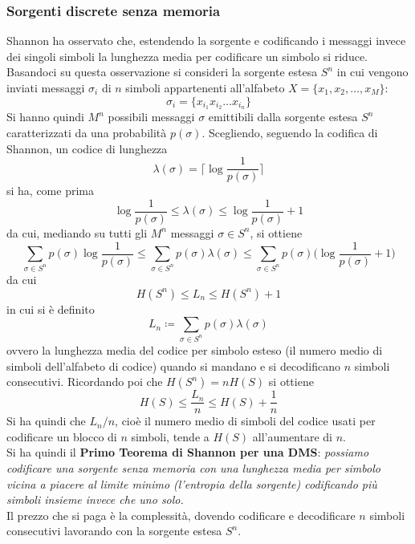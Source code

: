 \subsubsection{Sorgenti discrete senza memoria}
Shannon ha osservato che, estendendo la sorgente e codificando i messaggi invece dei singoli simboli la lunghezza media per codificare un simbolo si riduce.
Basandoci su questa osservazione si consideri la sorgente estesa $S^n$ in cui vengono inviati messaggi $\sigma_i$ di $n$ simboli appartenenti all'alfabeto $X = \{x_1, x_2, \dots, x_M\}$:
\begin{equation*}
    \sigma_i = \{ x_{i_1} x_{i_2} \dots x_{i_n} \}
\end{equation*}
Si hanno quindi $M^n$ possibili messaggi $\sigma$ emittibili dalla sorgente estesa $S^n$ caratterizzati da una probabilit\`a $p(\sigma)$. Scegliendo, seguendo la codifica di Shannon, un codice di lunghezza
\begin{equation}
    \lambda(\sigma) = \Big \lceil \log \frac{1}{p(\sigma)} \Big \rceil
\end{equation}
si ha, come prima
\begin{equation*}
   \log \frac{1}{p(\sigma)} \leq \lambda(\sigma) \leq \log \frac{1}{p(\sigma)} + 1
\end{equation*}
da cui, mediando su tutti gli $M^n$ messaggi $\sigma \in S^n$, si ottiene
\begin{equation}
    \sum_{\sigma \in S^n} p(\sigma) \log \frac{1}{p(\sigma)} \leq \sum_{\sigma \in S^n} p(\sigma) \lambda(\sigma) \leq \sum_{\sigma \in S^n} p(\sigma) \Big ( \log \frac{1}{p(\sigma)} + 1 \Big )
\end{equation} da cui
\begin{equation}
    H(S^n) \leq L_n \leq H(S^n) + 1
\end{equation}
in cui si \`e definito
\begin{equation}
    L_n \coloneqq \sum_{\sigma \in S^n} p(\sigma) \lambda(\sigma)
\end{equation}
ovvero la lunghezza media del codice per simbolo esteso (il numero medio di simboli dell’alfabeto di codice) quando si mandano e si decodificano $n$ simboli consecutivi.
Ricordando poi che $H(S^n) = nH(S)$ si ottiene
\begin{equation}
    H(S) \leq \frac{L_n}{n} \leq H(S) + \frac{1}{n}
\end{equation}
Si ha quindi che $L_n / n$, cio\`e il numero medio di simboli del codice usati per codificare un blocco di $n$ simboli, tende a $H(S)$ all'aumentare di $n$. \\
Si ha quindi il \textbf{Primo Teorema di Shannon per una DMS}: \textit{possiamo codificare una sorgente senza memoria con una lunghezza media per simbolo vicina a piacere al limite minimo (l'entropia della sorgente) codificando più simboli insieme invece che uno solo.} \\
Il prezzo che si paga è la complessità, dovendo codificare e decodificare $n$ simboli consecutivi lavorando con la sorgente estesa $S^n$.
